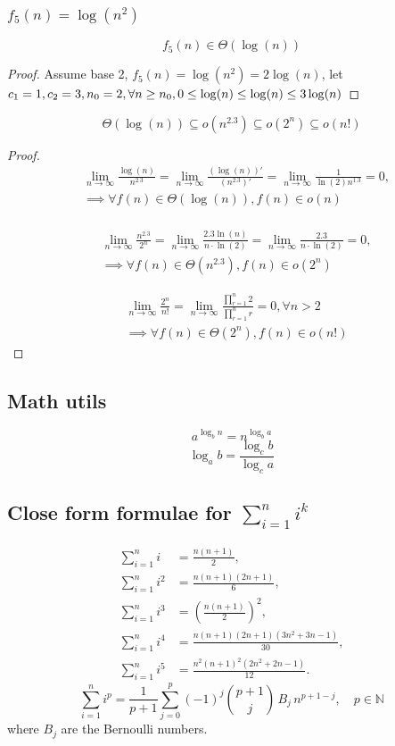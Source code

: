 \documentclass[9pt]{extarticle}
\begin{document}
\subsubsection*{$f_5(n) = \log(n^{2})$}
\[f_5(n) \in \Theta(\log(n))\]
\begin{proof}
    Assume base 2, $f_5(n) = \log(n^2) = 2\log(n)$, let $c_1 = 1, c_2 = 3, n_0 = 2, \\ \forall n \geq n_0, 0 \leq \log(n) \leq \log(n) \leq 3\log(n)$
\end{proof}
\[\Theta(\log(n)) \subseteq o(n^{2.3}) \subseteq o(2^n) \subseteq o(n!)\]
\begin{proof}
    \begin{align*}
        & \lim_{n \rightarrow \infty} \frac{\log(n)}{n^{2.3}} = \lim_{n \rightarrow \infty} \frac{(\log(n))'}{(n^{2.3})'} = \lim_{n \rightarrow \infty} \frac{1}{\ln(2)n^{1.3}} = 0, \\
        & \implies \forall f(n) \in \Theta(\log(n)), f(n) \in o(n)\\
    \end{align*}

    \begin{align*}
        & \lim_{n \rightarrow \infty} \frac{n^{2.3}}{2^n} = \lim_{n \rightarrow \infty} \frac{2.3\ln(n)}{n\cdot \ln(2)} = \lim_{n \rightarrow \infty} \frac{2.3}{n\cdot \ln(2)} = 0, \\
        & \implies \forall f(n) \in \Theta(n^{2.3}), f(n) \in o(2^n)
    \end{align*}

    \begin{align*}
        & \lim_{n \rightarrow \infty} \frac{2^n}{n!} = \lim_{n \rightarrow \infty} \frac{\prod_{r=1}^{n}2}{\prod_{r=1}^{n} r} = 0,  \forall n > 2\\
        & \implies \forall f(n) \in \Theta(2^n), f(n) \in o(n!)
    \end{align*}

\end{proof}
\subsection{Math utils}
\[a^{\log_bn} = n^{\log_ba}\]
\[\log_ab = \frac{\log_cb}{\log_ca}\]
\subsection*{Close form formulae for $\sum_{i=1}^{n}i^k$}
\begin{align*}
    \sum_{i=1}^n i   &= \frac{n(n+1)}{2}, \\[6pt]
    \sum_{i=1}^n i^2 &= \frac{n(n+1)(2n+1)}{6}, \\[6pt]
    \sum_{i=1}^n i^3 &= \left(\frac{n(n+1)}{2}\right)^2, \\[6pt]
    \sum_{i=1}^n i^4 &= \frac{n(n+1)(2n+1)(3n^2+3n-1)}{30}, \\[6pt]
    \sum_{i=1}^n i^5 &= \frac{n^2 (n+1)^2 (2n^2+2n-1)}{12}.
\end{align*}
\[\sum_{i=1}^{n} i^p = \frac{1}{p+1}\sum_{j=0}^{p} (-1)^j \binom{p+1}{j}\, B_j \, n^{p+1-j},
\quad p\in\mathbb{N}\] 
where \(B_j\) are the Bernoulli numbers.    
\end{document}
